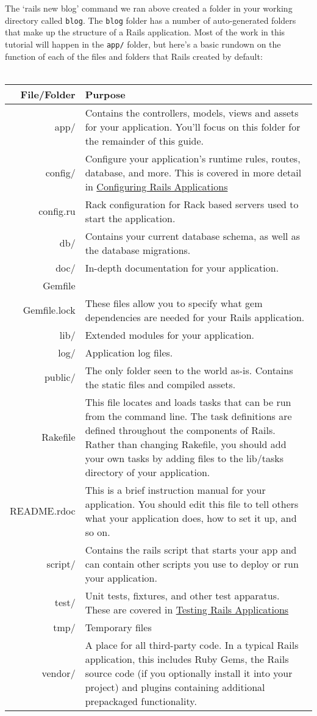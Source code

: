 \documentclass[10pt]{book}
\begin{document}
The ‘rails new blog’ command we ran above created a folder in your working directory called \texttt{blog}. The \texttt{blog} folder has a number of auto-generated folders that make up the structure of a Rails application. Most of the work in this tutorial will happen in the \texttt{app/} folder, but here’s a basic rundown on the function of each of the files and folders that Rails created by default:
\\ \\
\begin{tabular}{r|p{}}
\hline 
\textbf{File/Folder} & \textbf{Purpose} \\ 
\hline 
app/ & Contains the controllers, models, views and assets for your  application. You’ll focus on this folder for the remainder of this  guide. \\ 
config/ & Configure your application’s runtime rules, routes, database, and more.  This is covered in more detail in \href{http://guides.rubyonrails.org/configuring.html}{Configuring Rails Applications} \\ 
config.ru & Rack configuration for Rack based servers used to start the application. \\ 
db/ & Contains your current database schema, as well as the database migrations. \\ 
doc/ & In-depth documentation for your application. \\ 
Gemfile
\\Gemfile.lock & These files allow you to specify what gem dependencies are needed for your Rails application. \\ 
lib/ & Extended modules for your application. \\ 
log/ & Application log files. \\ 
public/ & The only folder seen to the world as-is. Contains the static files and compiled assets. \\ 
Rakefile & This file locates and loads tasks that can be run from the command  line. The task definitions are defined throughout the components of  Rails. Rather than changing Rakefile, you should add your own tasks by  adding files to the lib/tasks directory of your application. \\ 
README.rdoc & This is a brief instruction manual for your application. You  should edit this file to tell others what your application does, how to  set it up, and so on. \\ 
script/ & Contains the rails script that starts your app and can contain other scripts you use to deploy or run your application. \\ 
test/ & Unit tests, fixtures, and other test apparatus. These are covered in \href{http://guides.rubyonrails.org/testing.html}{Testing Rails Applications} \\ 
tmp/ & Temporary files \\ 
vendor/ & A place for all third-party code. In a typical Rails application,  this includes Ruby Gems, the Rails source code (if you optionally  install it into your project) and plugins containing additional  prepackaged functionality.
\end{tabular}
\end{document}

